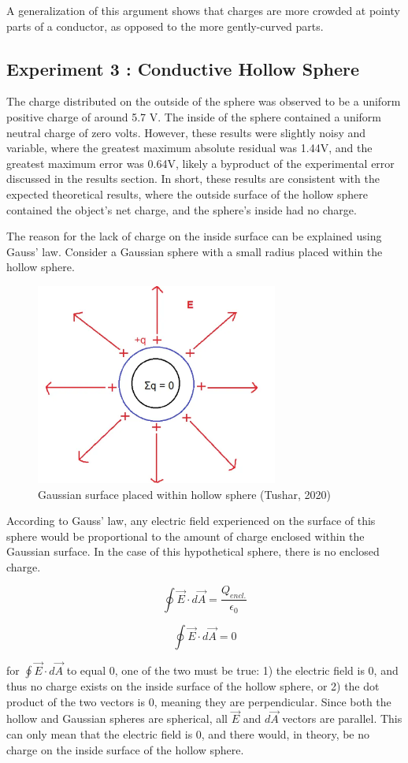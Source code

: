 A generalization of this argument shows that charges are more crowded at pointy parts of
a conductor, as opposed to the more gently-curved parts.


\newpage

\subsection{Experiment 3 : Conductive Hollow Sphere}

The charge distributed on the outside of the sphere was observed to be a uniform positive charge of around 5.7 V. The inside of the sphere contained a uniform neutral charge of zero volts. However, these results were slightly noisy and variable, where the greatest maximum absolute residual was 1.44V, and the greatest maximum error was 0.64V, likely a byproduct of the experimental error discussed in the results section. In short, these results are consistent with the expected theoretical results, where the outside surface of the hollow sphere contained the object's net charge, and the sphere's inside had no charge.

The reason for the lack of charge on the inside surface can be explained using Gauss' law. Consider a Gaussian sphere with a small radius placed within the hollow sphere. 

\begin{figure}[h]
    \centering
    \includegraphics[height=250px]{photos/hollowtheory.png}
    \caption{Gaussian surface placed within hollow sphere (Tushar, 2020)}
    \label{fig:gaussiansurface}
\end{figure}
According to Gauss' law, any electric field experienced on the surface of this sphere would be proportional to the amount of charge enclosed within the Gaussian surface. In the case of this hypothetical sphere, there is no enclosed charge. 

$$\oint \vec{E} \cdot d\vec{A} = \frac{Q_{encl.}}{\epsilon_{0}}$$

$$\oint \vec{E} \cdot d\vec{A} = 0$$

for $\oint \vec{E} \cdot d\vec{A}$ to equal $0$, one of the two must be true:
1) the electric field is 0, and thus no charge exists on the inside surface of the hollow sphere, or
2) the dot product of the two vectors is $0$, meaning they are perpendicular.
Since both the hollow and Gaussian spheres are spherical, all $\vec{E}$ and $d\vec{A}$ vectors are parallel. This can only mean that the electric field is 0, and there would, in theory, be no charge on the inside surface of the hollow sphere.


\newpage
